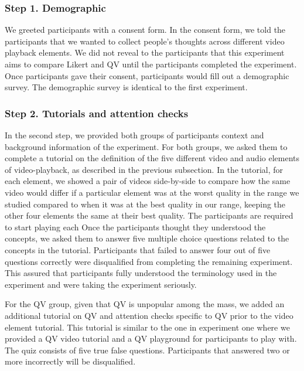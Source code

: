 \subsubsection{Step 1. Demographic}
We greeted participants with a consent form. In the consent form, we told the participants that we wanted to collect people's thoughts across different video playback elements. We did not reveal to the participants that this experiment aims to compare Likert and QV until the participants completed the experiment. Once participants gave their consent, participants would fill out a demographic survey. The demographic survey is identical to the first experiment.

\subsubsection{Step 2. Tutorials and attention checks}
In the second step, we provided both groups of participants context and background information of the experiment. For both groups, we asked them to complete a tutorial on the definition of the five different video and audio elements of video-playback, as described in the previous subsection. In the tutorial, for each element, we showed a pair of videos side-by-side to compare how the same video would differ if a particular element was at the worst quality in the range we studied compared to when it was at the best quality in our range, keeping the other four elements the same at their best quality. The participants are required to start playing each Once the participants thought they understood the concepts, we asked them to answer five multiple choice questions related to the concepts in the tutorial. Participants that failed to answer four out of five questions correctly were disqualified from completing the remaining experiment. This assured that participants fully understood the terminology used in the experiment and were taking the experiment seriously. 

For the QV group, given that QV is unpopular among the mass, we added an additional tutorial on QV and attention checks specific to QV prior to the video element tutorial. This tutorial is similar to the one in experiment one where we provided a QV video tutorial and a QV playground for participants to play with. The quiz consists of five true false questions. Participants that answered two or more incorrectly will be disqualified.


